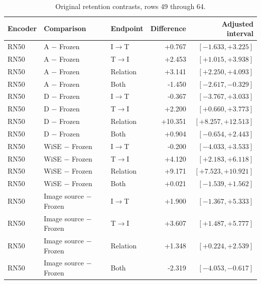 \begin{table}[t]
\centering
\small
\setlength{\tabcolsep}{3pt}
\begin{tabular}{lllrr}
\toprule
Encoder & Comparison & Endpoint & Difference & Adjusted interval\\
\midrule
RN50 & A $-$ Frozen & I$\to$T & +0.767 & $[-1.633,+3.225]$ \\
RN50 & A $-$ Frozen & T$\to$I & +2.453 & $[+1.015,+3.938]$ \\
RN50 & A $-$ Frozen & Relation & +3.141 & $[+2.250,+4.093]$ \\
RN50 & A $-$ Frozen & Both & -1.450 & $[-2.617,-0.329]$ \\
RN50 & D $-$ Frozen & I$\to$T & -0.367 & $[-3.767,+3.033]$ \\
RN50 & D $-$ Frozen & T$\to$I & +2.200 & $[+0.660,+3.773]$ \\
RN50 & D $-$ Frozen & Relation & +10.351 & $[+8.257,+12.513]$ \\
RN50 & D $-$ Frozen & Both & +0.904 & $[-0.654,+2.443]$ \\
RN50 & WiSE $-$ Frozen & I$\to$T & -0.200 & $[-4.033,+3.533]$ \\
RN50 & WiSE $-$ Frozen & T$\to$I & +4.120 & $[+2.183,+6.118]$ \\
RN50 & WiSE $-$ Frozen & Relation & +9.171 & $[+7.523,+10.921]$ \\
RN50 & WiSE $-$ Frozen & Both & +0.021 & $[-1.539,+1.562]$ \\
RN50 & Image source $-$ Frozen & I$\to$T & +1.900 & $[-1.367,+5.333]$ \\
RN50 & Image source $-$ Frozen & T$\to$I & +3.607 & $[+1.487,+5.777]$ \\
RN50 & Image source $-$ Frozen & Relation & +1.348 & $[+0.224,+2.539]$ \\
RN50 & Image source $-$ Frozen & Both & -2.319 & $[-4.053,-0.617]$ \\
\bottomrule
\end{tabular}
\caption{Original retention contrasts, rows 49 through 64.}\label{tab:originalretention48}
\end{table}


